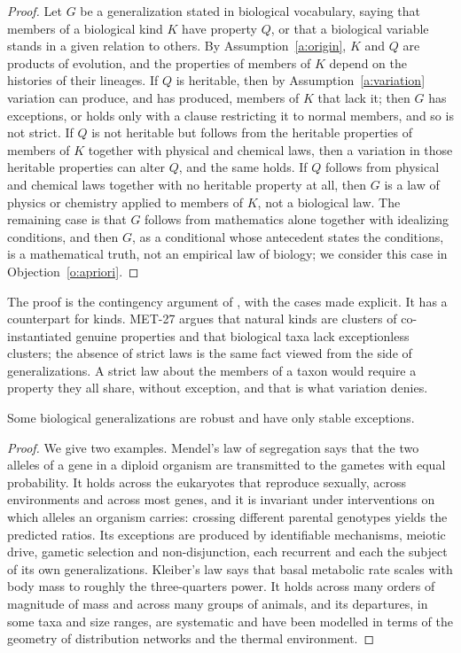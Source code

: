 \documentclass{situationist-preprint}
\begin{document}
\begin{proof}
Let $G$ be a generalization stated in biological vocabulary, saying that members of a biological kind $K$ have property $Q$, or that a biological variable stands in a given relation to others. By Assumption~\ref{a:origin}, $K$ and $Q$ are products of evolution, and the properties of members of $K$ depend on the histories of their lineages. If $Q$ is heritable, then by Assumption~\ref{a:variation} variation can produce, and has produced, members of $K$ that lack it; then $G$ has exceptions, or holds only with a clause restricting it to normal members, and so is not strict. If $Q$ is not heritable but follows from the heritable properties of members of $K$ together with physical and chemical laws, then a variation in those heritable properties can alter $Q$, and the same holds. If $Q$ follows from physical and chemical laws together with no heritable property at all, then $G$ is a law of physics or chemistry applied to members of $K$, not a biological law. The remaining case is that $G$ follows from mathematics alone together with idealizing conditions, and then $G$, as a conditional whose antecedent states the conditions, is a mathematical truth, not an empirical law of biology; we consider this case in Objection~\ref{o:apriori}.
\end{proof}

The proof is the contingency argument of \citet{Beatty1995}, with the cases made explicit. It has a counterpart for kinds. MET-27 argues that natural kinds are clusters of co-instantiated genuine properties and that biological taxa lack exceptionless clusters; the absence of strict laws is the same fact viewed from the side of generalizations. A strict law about the members of a taxon would require a property they all share, without exception, and that is what variation denies.

\begin{proposition}\label{p:robust}
Some biological generalizations are robust and have only stable exceptions.
\end{proposition}

\begin{proof}
We give two examples. Mendel's law of segregation says that the two alleles of a gene in a diploid organism are transmitted to the gametes with equal probability. It holds across the eukaryotes that reproduce sexually, across environments and across most genes, and it is invariant under interventions on which alleles an organism carries: crossing different parental genotypes yields the predicted ratios. Its exceptions are produced by identifiable mechanisms, meiotic drive, gametic selection and non-disjunction, each recurrent and each the subject of its own generalizations. Kleiber's law says that basal metabolic rate scales with body mass to roughly the three-quarters power. It holds across many orders of magnitude of mass and across many groups of animals, and its departures, in some taxa and size ranges, are systematic and have been modelled in terms of the geometry of distribution networks and the thermal environment.
\end{proof}
\end{document}
